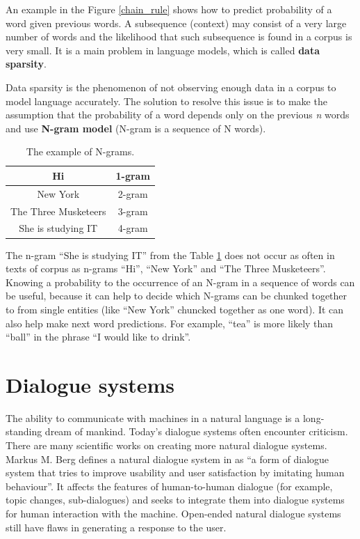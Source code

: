 An example in the Figure \ref{chain_rule} shows how to predict probability of a word given previous words. A subsequence (context) may consist of a very large number of words and the likelihood that such subsequence is found in a corpus is very small. It is a main problem in language models, which is called \textbf{data sparsity}.

Data sparsity is the phenomenon of not observing enough data in a corpus to model language accurately. The solution to resolve this issue is to make the assumption that the probability of a word depends only on the previous \textit{n} words and use \textbf{N-gram model} (N-gram is a sequence of N words).

\begin{table}[t]
  \centering
   \begin{tabular}{|c|c|} 
   \hline
    Hi & 1-gram \\
   \hline
    New York & 2-gram \\
   \hline
   The Three Musketeers & 3-gram \\
   \hline
   She is studying IT & 4-gram \\
   \hline
   \end{tabular}
   \caption{The example of N-grams.}
  \label{tab:n_gram}
\end{table}

The n-gram ``She is studying IT'' from the Table \ref{tab:n_gram} does not occur as often in texts of corpus as n-grams ``Hi'', ``New York'' and ``The Three Musketeers''. Knowing a probability to the occurrence of an N-gram in a sequence of words can be useful, because it can help to decide which N-grams can be chunked together to from single entities (like ``New York'' chuncked together as one word). It can also help make next word predictions. For example, ``tea'' is more likely than ``ball'' in the phrase ``I would like to drink''.

\section{Dialogue systems} 
The ability to communicate with machines in a natural language is a long-standing dream of mankind. Today's dialogue systems often encounter criticism. There are many scientific works on creating more natural dialogue systems. Markus M. Berg defines a natural dialogue system in \cite{berg2014modelling} as ``a form of dialogue system that tries to improve usability and user satisfaction by imitating human behaviour''. It affects the features of human-to-human dialogue (for example, topic changes, sub-dialogues) and seeks to integrate them into dialogue systems for human interaction with the machine. Open-ended natural dialogue systems still have flaws in generating a response to the user.

